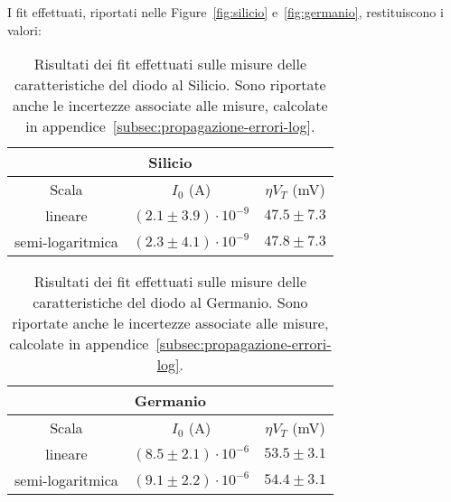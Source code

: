 \documentclass[@SRC@/main]{subfiles}
\begin{document}
    \noindent I fit effettuati, riportati nelle Figure~\ref{fig:silicio} e~\ref{fig:germanio}, restituiscono i valori:
    \vspace{0.2cm}
    \begin{table}[ht]
      \centering
      \begin{tabular}{||c|c|c||}
        \hline
        \multicolumn{3}{||c||}{Silicio} \\
        \hline
        Scala            & $I_0$ (\textnormal{A})       & $\eta V_T$ (\textnormal{mV}) \\
        \hline
        lineare          & $(2.1\pm3.9)\cdot 10^{-9}$   & $47.5\pm7.3$                 \\
        \hline
        semi-logaritmica & $(2.3 \pm 4.1)\cdot 10^{-9}$ & $47.8\pm 7.3$                \\
        \hline
      \end{tabular}
      \caption{Risultati dei fit effettuati sulle misure delle caratteristiche del diodo
      al Silicio. Sono riportate anche le incertezze associate alle misure, calcolate in
      appendice~\ref{subsec:propagazione-errori-log}.}
      \label{tab:fit-silicio}
    \end{table}

    \begin{table}[ht]
      \centering
      \begin{tabular}{||c|c|c||}
        \hline
        \multicolumn{3}{||c||}{Germanio} \\
        \hline
        Scala            & $I_0$ (\textnormal{A})       & $\eta V_T $ (\textnormal{mV}) \\
        \hline
        lineare          & $(8.5\pm2.1) \cdot 10^{-6}$  & $53.5\pm3.1$                  \\
        \hline
        semi-logaritmica & $(9.1\pm 2.2) \cdot 10^{-6}$ & $54.4\pm3.1$                  \\
        \hline
      \end{tabular}
      \caption{Risultati dei fit effettuati sulle misure delle caratteristiche del diodo
      al Germanio. Sono riportate anche le incertezze associate alle misure, calcolate in
      appendice~\ref{subsec:propagazione-errori-log}.}
      \label{tab:fit-germanio}
    \end{table}

\end{document}
